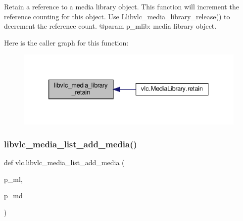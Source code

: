 \begin{DoxyVerb}Retain a reference to a media library object. This function will
increment the reference counting for this object. Use
L{libvlc_media_library_release}() to decrement the reference count.
@param p_mlib: media library object.
\end{DoxyVerb}
 Here is the caller graph for this function\+:
\nopagebreak
\begin{figure}[H]
\begin{center}
\leavevmode
\includegraphics[width=333pt]{namespacevlc_a16294700c444448851d5055267aa57aa_icgraph}
\end{center}
\end{figure}
\mbox{\label{namespacevlc_a98a21d94dfa80441792c173767f7df39}} 
\subsubsection{\texorpdfstring{libvlc\+\_\+media\+\_\+list\+\_\+add\+\_\+media()}{libvlc\_media\_list\_add\_media()}}
{\footnotesize\ttfamily def vlc.\+libvlc\+\_\+media\+\_\+list\+\_\+add\+\_\+media (\begin{DoxyParamCaption}\item[{}]{p\+\_\+ml,  }\item[{}]{p\+\_\+md }\end{DoxyParamCaption})}

